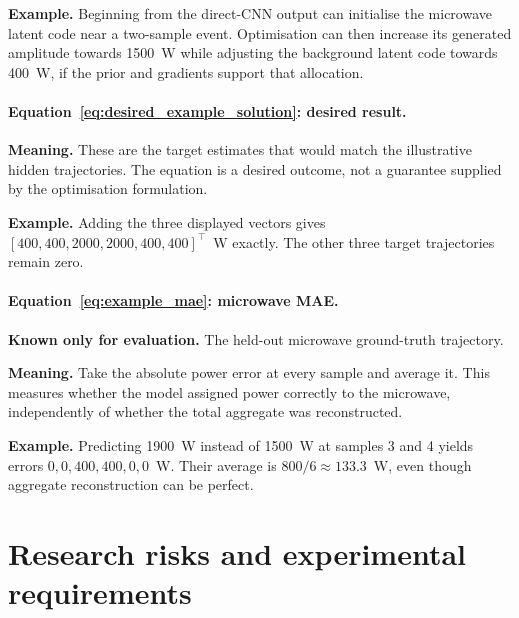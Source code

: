\documentclass[11pt]{article}
\begin{document}
\textbf{Example.} Beginning from the direct-CNN output can initialise the microwave latent code near a two-sample event. Optimisation can then increase its generated amplitude towards 1500~W while adjusting the background latent code towards 400~W, if the prior and gradients support that allocation.

\paragraph{Equation~\eqref{eq:desired_example_solution}: desired result.}
\textbf{Meaning.} These are the target estimates that would match the illustrative hidden trajectories. The equation is a desired outcome, not a guarantee supplied by the optimisation formulation.

\textbf{Example.} Adding the three displayed vectors gives $[400,400,2000,2000,400,400]^{\top}$~W exactly. The other three target trajectories remain zero.

\paragraph{Equation~\eqref{eq:example_mae}: microwave MAE.}
\textbf{Known only for evaluation.} The held-out microwave ground-truth trajectory.

\textbf{Meaning.} Take the absolute power error at every sample and average it. This measures whether the model assigned power correctly to the microwave, independently of whether the total aggregate was reconstructed.

\textbf{Example.} Predicting 1900~W instead of 1500~W at samples 3 and 4 yields errors $0,0,400,400,0,0$~W. Their average is $800/6\approx133.3$~W, even though aggregate reconstruction can be perfect.

\section{Research risks and experimental requirements}
\end{document}
